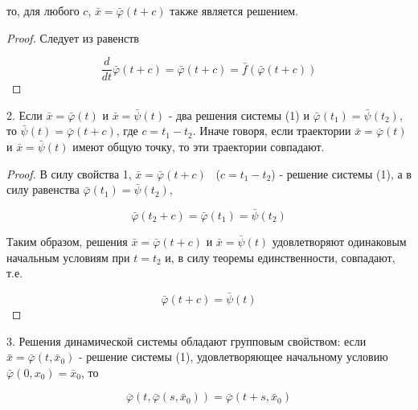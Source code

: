\documentclass{article}
\theoremstyle{definition} \newtheorem*{theorem*}{Теорема}
\theoremstyle{plain} \newtheorem{theorem}{Теорема}[section]
\theoremstyle{definition} \newtheorem*{corollary*}{Следствие}
\theoremstyle{definition} \newtheorem{corollary}{Следствие}[section]
\begin{document}
то, для любого $c$, $\bar{x} = \bar{\varphi}(t + c)$
также является решением.
\begin{proof}
Следует из равенств

\begin{equation*}
    \frac{d}{dt} \bar{\varphi}(t + c)
    = \bar{\varphi}(t + c)
    = \bar{f}(\bar{\varphi}(t + c))
\end{equation*}

\end{proof}

2. Если $\bar{x} = \bar{\varphi}(t)$ и $\bar{x} =
\bar{\psi}(t)$ - два решения системы (1) и
$\bar{\varphi}(t_1) = \bar{\psi}(t_2)$,
то $\bar{\psi}(t) = \bar{\varphi}(t + c)$,
где $c = t_1 - t_2$.
Иначе говоря, если траектории $\bar{x} = \bar{\varphi}(t)$ и
$\bar{x} = \bar{\psi}(t)$ имеют общую точку,
то эти траектории совпадают.

\begin{proof}
В силу свойства 1, $\bar{x} = \bar{\varphi}(t + c)$ \
($c = t_1 - t_2$) - решение системы (1),
а в силу равенства $\bar{\varphi}(t_1) = \bar{\psi}(t_2)$,

\begin{equation*}
    \bar{\varphi}(t_2 + c)
    = \bar{\varphi}(t_1)
    = \bar{\psi}(t_2)
\end{equation*}

Таким образом, решения $\bar{x} = \bar{\varphi}(t + c)$
и $\bar{x} = \bar{\psi}(t)$
удовлетворяют одинаковым начальным
условиям при $t = t_2$ и, в силу теоремы единственности,
совпадают, т.е.

\begin{equation*}
    \bar{\varphi}(t + c) = \bar{\psi}(t)
\end{equation*}

\end{proof}

3. Решения динамической системы обладают групповым свойством:
если $\bar{x} = \bar{\varphi}(t, \bar{x}_0)$ - решение
системы (1), удовлетворяющее начальному условию
$\bar{\varphi}(0, x_0) =\bar{x}_0$, то

\begin{equation*}
    \bar{\varphi}(t, \bar{\varphi}(s, \bar{x}_0))
    = \bar{\varphi}(t + s, \bar{x}_0)
\end{equation*}
\end{document}
